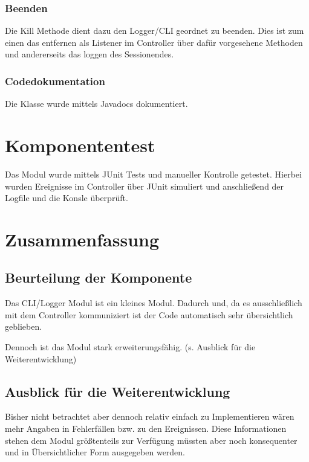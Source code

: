 \subsection{Beenden}
Die Kill Methode dient dazu den Logger/CLI geordnet zu beenden. Dies ist zum
einen das entfernen als Listener im Controller über dafür vorgesehene Methoden
und andererseits das loggen des Sessionendes.

\subsection{Codedokumentation}
Die Klasse wurde mittels Javadocs dokumentiert.

\chapter{Komponententest}

Das Modul wurde mittels JUnit Tests und manueller Kontrolle getestet. Hierbei
wurden Ereignisse im Controller über JUnit simuliert und anschließend der
Logfile und die Konsle überprüft.

\chapter{Zusammenfassung}

\section{Beurteilung der Komponente}
Das CLI/Logger Modul ist ein kleines Modul. Dadurch und, da es ausschließlich
mit dem Controller kommuniziert ist der Code automatisch sehr übersichtlich
geblieben. 

Dennoch ist das Modul stark erweiterungsfähig. (s. Ausblick für die
Weiterentwicklung)



\section{Ausblick für die Weiterentwicklung}
Bisher nicht betrachtet aber dennoch relativ einfach zu Implementieren wären
mehr Angaben in Fehlerfällen bzw. zu den Ereignissen. Diese Informationen stehen
dem Modul größtenteils zur Verfügung müssten aber noch konsequenter und in
Übersichtlicher Form ausgegeben werden.